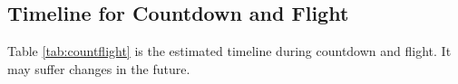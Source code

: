\subsection{Timeline for Countdown and Flight}
Table \ref{tab:countflight} is the estimated timeline during countdown and flight. It may suffer changes in the future.
